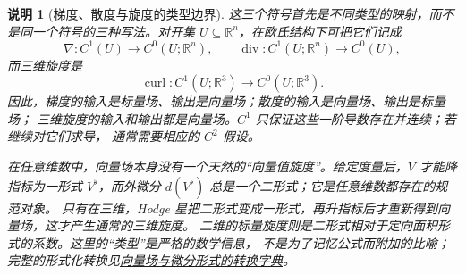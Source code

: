 \documentclass[UTF8,fontset=none,a4paper,11pt]{ctexart}
\theoremstyle{foundation-definition}
\theoremstyle{foundation-theorem}
\theoremstyle{foundation-proposition}
\theoremstyle{foundation-example}
\theoremstyle{foundation-remark}
\newtheorem{remark}[definition]{说明}
\theoremstyle{foundation-theorem}
\newcommand{\term}[2]{\hyperref[#1]{#2}}
\begin{document}
\begin{remark}[梯度、散度与旋度的类型边界]\label{rem:vector-calculus-types}
这三个符号首先是不同类型的映射，而不是同一个符号的三种写法。对开集
\(U\subseteq\mathbb R^n\)，在欧氏结构下可把它们记成
\[
\nabla:C^1(U)\longrightarrow C^0(U;\mathbb R^n),\qquad
\operatorname{div}:C^1(U;\mathbb R^n)\longrightarrow C^0(U),
\]
而三维旋度是
\[
\operatorname{curl}:C^1(U;\mathbb R^3)\longrightarrow C^0(U;\mathbb R^3).
\]
因此，梯度的输入是标量场、输出是向量场；散度的输入是向量场、输出是标量场；
三维旋度的输入和输出都是向量场。\(C^1\) 只保证这些一阶导数存在并连续；若继续对它们求导，
通常需要相应的 \(C^2\) 假设。

在任意维数中，向量场本身没有一个天然的“向量值旋度”。给定度量后，\(V\) 才能降指标为一形式
\(V^\flat\)，而外微分 \(d(V^\flat)\) 总是一个二形式；它是任意维数都存在的规范对象。
只有在三维，Hodge 星把二形式变成一形式，再升指标后才重新得到向量场，这才产生通常的三维旋度。
二维的标量旋度则是二形式相对于定向面积形式的系数。这里的“类型”是严格的数学信息，
不是为了记忆公式而附加的比喻；完整的形式化转换见\term{prop:vector-form-dictionary}{向量场与微分形式的转换字典}。
\end{remark}
\end{document}
